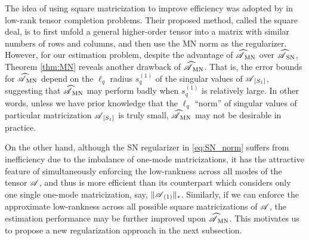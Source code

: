 \documentclass[12pt]{article}
\newcommand{\cm}[1]{\mbox{\boldmath$\mathscr{#1}$}}
\begin{document}
The idea of using square matricization to improve efficiency was adopted by \citet{mu2014square} in low-rank tensor completion problems. Their proposed method, called the square deal, is to first unfold a general higher-order tensor into a matrix with similar numbers of rows and columns, and then use the MN norm as the regularizer. However, for our estimation problem, despite the advantage of $\cm{\widehat{A}}_{\textup{MN}}$  over $\cm{\widehat{A}}_{\textup{SN}}$, Theorem \ref{thm:MN} reveals another drawback of $\cm{\widehat{A}}_{\textup{MN}}$. 
That is, the  error bounds for $\cm{\widehat{A}}_{\textup{MN}}$  depend on the $\ell_q$ radius $s_q^{(1)}$ of the singular values of $\cm{A}_{[S_1]}$, suggesting that $\cm{\widehat{A}}_{\textup{MN}}$ may perform badly when $s_q^{(1)}$ is relatively large.  
In other words, unless we have prior knowledge that the $\ell_q$ ``norm'' of singular values of particular matricization $\cm{A}_{[S_1]}$ is truly small, $\cm{\widehat{A}}_{\textup{MN}}$ may not be desirable in practice. 

On the other hand, although the SN regularizer in \eqref{eq:SN_norm} suffers from  inefficiency due to the imbalance of one-mode matricizations,  it has the attractive feature of simultaneously enforcing the low-rankness across all modes of the tensor $\cm{A}$, and thus is more  efficient than its counterpart which considers only one single one-mode matricization, say, $\|\cm{A}_{(1)}\|_*$. Similarly, if we can enforce the approximate low-rankness across all possible square matricizations of $\cm{A}$, the estimation performance may be further improved upon $\cm{\widehat{A}}_{\textup{MN}}$.  This motivates us to propose  a new regularization approach in the next subsection.
\end{document}
